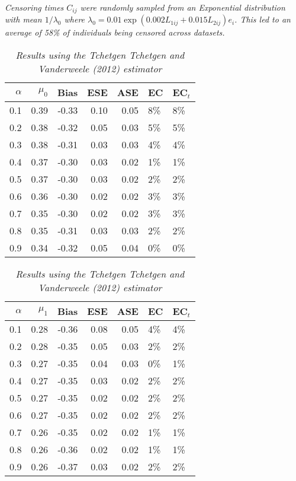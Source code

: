\documentclass[12pt, letterpaper]{article}
\begin{document}
\begin{table}[ht!]
{		\textit{Censoring times $C_{ij}$ were randomly sampled from an Exponential distribution with mean $1/\lambda_0$ where $\lambda_0=0.01\exp(0.002L_{1ij}+0.015L_{2ij})e_i$. This led to an average of 58\% of individuals being censored across datasets.}	
	}
\end{table}
\begin{table}[ht!]
	\centering
	\bgroup
	\def\arraystretch{1.25}
	\setlength\tabcolsep{0.05in}
	\begin{tabular}{rrrrrll}
		\hline
		$\alpha$ & $\mu_0$ & Bias & ESE & ASE & EC & EC$_t$ \\ \hline
		0.1 & 0.39 & -0.33 & 0.10 & 0.05 & 8\% & 8\% \\ 
		0.2 & 0.38 & -0.32 & 0.05 & 0.03 & 5\% & 5\% \\ 
		0.3 & 0.38 & -0.31 & 0.03 & 0.03 & 4\% & 4\% \\ 
		0.4 & 0.37 & -0.30 & 0.03 & 0.02 & 1\% & 1\% \\ 
		0.5 & 0.37 & -0.30 & 0.03 & 0.02 & 2\% & 2\% \\ 
		0.6 & 0.36 & -0.30 & 0.02 & 0.02 & 3\% & 3\% \\ 
		0.7 & 0.35 & -0.30 & 0.02 & 0.02 & 3\% & 3\% \\ 
		0.8 & 0.35 & -0.31 & 0.03 & 0.03 & 2\% & 2\% \\ 
		0.9 & 0.34 & -0.32 & 0.05 & 0.04 & 0\% & 0\% \\ 
		\hline
	\end{tabular}
	\egroup
	\quad 
	\bgroup
	\setlength\tabcolsep{0.05in}
	\def\arraystretch{1.25}
	\begin{tabular}{rrrrrll}
		\hline
		$\alpha$ & $\mu_1$ & Bias & ESE & ASE & EC & EC$_t$ \\ \hline
		0.1 & 0.28 & -0.36 & 0.08 & 0.05 & 4\% & 4\% \\ 
		0.2 & 0.28 & -0.35 & 0.05 & 0.03 & 2\% & 2\% \\ 
		0.3 & 0.27 & -0.35 & 0.04 & 0.03 & 0\% & 1\% \\ 
		0.4 & 0.27 & -0.35 & 0.03 & 0.02 & 2\% & 2\% \\ 
		0.5 & 0.27 & -0.35 & 0.02 & 0.02 & 2\% & 2\% \\ 
		0.6 & 0.27 & -0.35 & 0.02 & 0.02 & 2\% & 2\% \\ 
		0.7 & 0.26 & -0.35 & 0.02 & 0.02 & 1\% & 1\% \\ 
		0.8 & 0.26 & -0.36 & 0.02 & 0.02 & 1\% & 1\% \\ 
		0.9 & 0.26 & -0.37 & 0.03 & 0.02 & 2\% & 2\% \\ 
		\hline
	\end{tabular}
	\egroup
	\caption*{
		\textit{Results using the Tchetgen Tchetgen and Vanderweele (2012) estimator}	
	}
\end{table}
\end{document}
